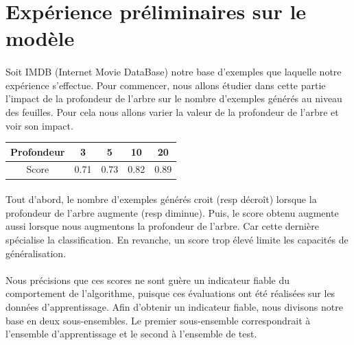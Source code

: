 \documentclass{report}
\begin{document}
\section{Expérience préliminaires sur le modèle}
\paragraph{}
Soit IMDB (Internet Movie DataBase) notre base d'exemples que laquelle notre expérience s'effectue. Pour commencer, nous allons étudier dans cette partie l'impact de la profondeur de l'arbre sur le nombre  d'exemples générés au niveau des feuilles. Pour cela nous allons varier la valeur de la profondeur de l'arbre et voir son impact.
\linebreak
\linebreak
\begin {center}
\begin{tabular}{|c|c|c|c|c|}
  \hline \rowcolor{lightgray}
  Profondeur & 3 & 5 & 10 & 20 \\
  \hline
  Score & 0.71 & 0.73 & 0.82 & 0.89 \\
  \hline
\end{tabular}
\end {center}
\paragraph{}
Tout d'abord, le nombre d'exemples générés croit (resp décroît) lorsque la profondeur de l'arbre augmente (resp diminue). Puis, le score obtenu augmente aussi lorsque nous augmentons la profondeur de l'arbre. Car cette dernière spécialise la classification. En revanche, un score trop élevé limite les capacités de généralisation.

\paragraph{}
 Nous précisions que ces scores ne sont guère un indicateur fiable du comportement de l’algorithme, puisque ces évaluations ont été réalisées sur les données d’apprentissage. Afin d'obtenir un indicateur fiable, nous divisons notre base en deux sous-ensembles. Le premier sous-ensemble correspondrait à l'ensemble d'apprentissage et le second à l'ensemble de test.
 
\end{document}
